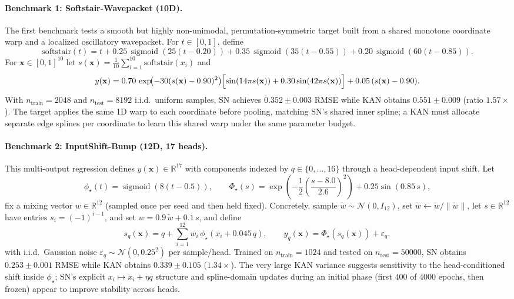 \documentclass{article}
\theoremstyle{plain}
\theoremstyle{definition}
\theoremstyle{remark}
\begin{document}
\paragraph{Benchmark 1: Softstair-Wavepacket (10D).}
The first benchmark tests a smooth but highly non-unimodal, permutation-symmetric target built from a shared monotone coordinate warp and a localized oscillatory wavepacket. For $t\in[0,1]$, define
$$\mathrm{softstair}(t)=t
+0.25\,\operatorname{sigmoid}(25(t-0.20))
+0.35\,\operatorname{sigmoid}(35(t-0.55))
+0.20\,\operatorname{sigmoid}(60(t-0.85)).$$
For $\mathbf{x}\in[0,1]^{10}$ let $s(\mathbf{x})=\frac{1}{10}\sum_{i=1}^{10}\mathrm{softstair}(x_i)$ and
$$y(\mathbf{x})=0.70\,\exp\!\bigl(-30(s(\mathbf{x})-0.90)^2\bigr)\Bigl[\sin(14\pi s(\mathbf{x})) + 0.30\sin(42\pi s(\mathbf{x}))\Bigr] + 0.05\,(s(\mathbf{x})-0.90).$$
With $n_{\text{train}}=2048$ and $n_{\text{test}}=8192$ i.i.d.\ uniform samples, SN achieves $0.352 \pm 0.003$ RMSE while KAN obtains $0.551 \pm 0.009$ (ratio $1.57\times$). The target applies the same 1D warp to each coordinate before pooling, matching SN's shared inner spline; a KAN must allocate separate edge splines per coordinate to learn this shared warp under the same parameter budget.

\paragraph{Benchmark 2: InputShift-Bump (12D, 17 heads).}
This multi-output regression defines $y(\mathbf{x})\in\mathbb{R}^{17}$ with components indexed by $q\in\{0,\dots,16\}$ through a head-dependent input shift. Let
$$\phi_\star(t)=\operatorname{sigmoid}(8(t-0.5)),\qquad
\Phi_\star(s)=\exp\!\left(-\frac12\left(\frac{s-8.0}{2.6}\right)^2\right)+0.25\sin(0.85\,s),$$
fix a mixing vector $w\in\mathbb{R}^{12}$ (sampled once per seed and then held fixed). Concretely, sample $\tilde{w}\sim\mathcal{N}(0,I_{12})$, set $\tilde{w}\leftarrow \tilde{w}/\|\tilde{w}\|$, let $s\in\mathbb{R}^{12}$ have entries $s_i=(-1)^{i-1}$, and set $w=0.9\,\tilde{w}+0.1\,s$, and define
$$s_q(\mathbf{x}) = q + \sum_{i=1}^{12} w_i\,\phi_\star(x_i + 0.045\,q),\qquad
y_q(\mathbf{x}) = \Phi_\star(s_q(\mathbf{x})) + \varepsilon_{q},$$
with i.i.d.\ Gaussian noise $\varepsilon_q\sim\mathcal{N}(0,0.25^2)$ per sample/head. Trained on $n_{\text{train}}=1024$ and tested on $n_{\text{test}}=50000$, SN obtains $0.253 \pm 0.001$ RMSE while KAN obtains $0.339 \pm 0.105$ ($1.34\times$). The very large KAN variance suggests sensitivity to the head-conditioned shift inside $\phi_\star$; SN's explicit $x_i\mapsto x_i+\eta q$ structure and spline-domain updates during an initial phase (first $400$ of $4000$ epochs, then frozen) appear to improve stability across heads.
\end{document}
